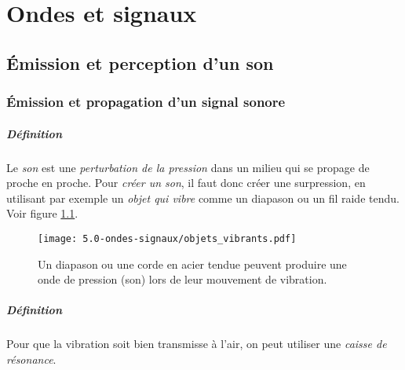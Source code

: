 \chapter{Ondes et signaux}

\section{Émission et perception d'un son}
\subsection{Émission et propagation d'un signal sonore}
\paragraph{Définition} Le \textit{son} est une \textit{perturbation de la pression}
dans un milieu qui se propage de proche en proche. Pour \textit{créer un son}, il faut donc créer une surpression, en utilisant par exemple un \textit{objet qui vibre} comme un diapason ou un fil raide tendu. Voir figure \ref{fig:objets_vibrants}.
\begin{figure}[h!]
  \begin{center}
      \texttt{[image: 5.0-ondes-signaux/objets\_vibrants.pdf]}
  \end{center}
  \caption{Un diapason ou une corde en acier tendue peuvent produire une onde de pression (son) lors de leur mouvement de vibration.}
  \label{fig:objets_vibrants}
\end{figure}

\paragraph{Définition} Pour que la vibration soit bien transmisse à l'air, on peut
utiliser une \textit{caisse de résonance}.
